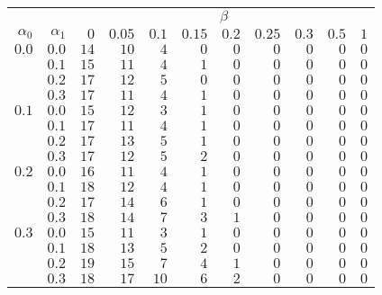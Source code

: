 \begin{tabular}{rr|rrrrrrrrr}
\hline\hline
 && \multicolumn{9}{c}{$\beta$}\\
 $\alpha_0$ & $\alpha_1$ & $0$ & $0.05$ & $0.1$ & $0.15$ & $0.2$ & $0.25$ & $0.3$ & $0.5$ & $1$ \\ 
 \hline
$0.0$ & $0.0$ & $14$ & $10$ & $4$ & $0$ & $0$ & $0$ & $0$ & $0$ & $0$\\ 
 & $0.1$ & $15$ & $11$ & $4$ & $1$ & $0$ & $0$ & $0$ & $0$ & $0$\\ 
 & $0.2$ & $17$ & $12$ & $5$ & $0$ & $0$ & $0$ & $0$ & $0$ & $0$\\ 
 & $0.3$ & $17$ & $11$ & $4$ & $1$ & $0$ & $0$ & $0$ & $0$ & $0$\\ 
\hline 
 $0.1$ & $0.0$ & $15$ & $12$ & $3$ & $1$ & $0$ & $0$ & $0$ & $0$ & $0$\\ 
 & $0.1$ & $17$ & $11$ & $4$ & $1$ & $0$ & $0$ & $0$ & $0$ & $0$\\ 
 & $0.2$ & $17$ & $13$ & $5$ & $1$ & $0$ & $0$ & $0$ & $0$ & $0$\\ 
 & $0.3$ & $17$ & $12$ & $5$ & $2$ & $0$ & $0$ & $0$ & $0$ & $0$\\ 
\hline 
 $0.2$ & $0.0$ & $16$ & $11$ & $4$ & $1$ & $0$ & $0$ & $0$ & $0$ & $0$\\ 
 & $0.1$ & $18$ & $12$ & $4$ & $1$ & $0$ & $0$ & $0$ & $0$ & $0$\\ 
 & $0.2$ & $17$ & $14$ & $6$ & $1$ & $0$ & $0$ & $0$ & $0$ & $0$\\ 
 & $0.3$ & $18$ & $14$ & $7$ & $3$ & $1$ & $0$ & $0$ & $0$ & $0$\\ 
\hline 
 $0.3$ & $0.0$ & $15$ & $11$ & $3$ & $1$ & $0$ & $0$ & $0$ & $0$ & $0$\\ 
 & $0.1$ & $18$ & $13$ & $5$ & $2$ & $0$ & $0$ & $0$ & $0$ & $0$\\ 
 & $0.2$ & $19$ & $15$ & $7$ & $4$ & $1$ & $0$ & $0$ & $0$ & $0$\\ 
 & $0.3$ & $18$ & $17$ & $10$ & $6$ & $2$ & $0$ & $0$ & $0$ & $0$\\ 
 \hline 
 \end{tabular}